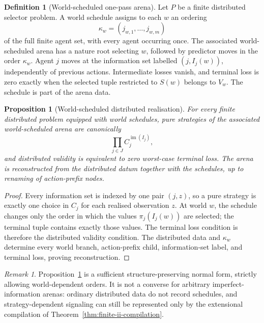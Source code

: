 \documentclass[11pt]{article}
\theoremstyle{plain}
\newtheorem{proposition}[theorem]{Proposition}
\theoremstyle{definition}
\newtheorem{definition}[theorem]{Definition}
\theoremstyle{remark}
\newtheorem{remark}[theorem]{Remark}
\newcommand{\im}{\operatorname{im}}
\begin{document}
\begin{definition}[World-scheduled one-pass arena]
\label{def:world-scheduled}
Let $P$ be a finite distributed selector problem. A world schedule assigns to
each $w$ an ordering
\[
\kappa_w=(j_{w,1},\ldots,j_{w,m})
\]
of the full finite agent set, with every agent occurring once. The associated
world-scheduled arena has a nature root selecting $w$, followed by predictor
moves in the order $\kappa_w$. Agent $j$ moves at the information set labelled
$(j,I_j(w))$, independently of previous actions. Intermediate losses vanish,
and terminal loss is zero exactly when the selected tuple restricted to $S(w)$
belongs to $V_w$. The schedule is part of the arena data.
\end{definition}

\begin{proposition}[World-scheduled distributed realisation]
\label{prop:world-scheduled}
For every finite distributed problem equipped with world schedules, pure
strategies of the associated world-scheduled arena are canonically
\[
\prod_{j\in J}C_j^{\im(I_j)},
\]
and distributed validity is equivalent to zero worst-case terminal loss. The
arena is reconstructed from the distributed datum together with the schedules,
up to renaming of action-prefix nodes.
\end{proposition}

\begin{proof}
Every information set is indexed by one pair $(j,z)$, so a pure strategy is
exactly one choice in $C_j$ for each realised observation $z$. At world $w$,
the schedule changes only the order in which the values
$\pi_j(I_j(w))$ are selected; the terminal tuple contains exactly those values.
The terminal loss condition is therefore the distributed validity condition.
The distributed data and $\kappa_w$ determine every world branch, action-prefix
child, information-set label, and terminal loss, proving reconstruction.
\end{proof}

\begin{remark}
Proposition~\ref{prop:world-scheduled} is a sufficient structure-preserving
normal form, strictly allowing world-dependent orders. It is not a converse for
arbitrary imperfect-information arenas: ordinary distributed data do not record
schedules, and strategy-dependent signaling can still be represented only by
the extensional compilation of Theorem~\ref{thm:finite-ii-compilation}.
\end{remark}
\end{document}

